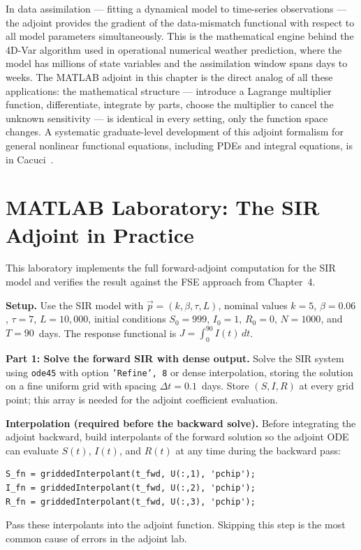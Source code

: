In data assimilation --- fitting a dynamical model to time-series
observations --- the adjoint provides the gradient of the
data-mismatch functional with respect to all model parameters
simultaneously.
This is the mathematical engine behind the 4D-Var algorithm used in
operational numerical weather prediction, where the model has
millions of state variables and the assimilation window spans days
to weeks.
The MATLAB adjoint in this chapter is the direct analog of all these
applications: the mathematical structure --- introduce a Lagrange
multiplier function, differentiate, integrate by parts, choose the
multiplier to cancel the unknown sensitivity --- is identical in
every setting, only the function space changes.
A systematic graduate-level development of this adjoint formalism
for general nonlinear functional equations, including PDEs and
integral equations, is in Cacuci~\cite{cacuci2003volume1}.

\section{MATLAB Laboratory: The SIR Adjoint in Practice}
\label{sec:ch6matlab}

This laboratory implements the full forward-adjoint computation
for the SIR model and verifies the result against the FSE approach
from Chapter~4.

\textbf{Setup.}
Use the SIR model with \POIs $\vec{p} = (k, \beta, \tau, L)$,
nominal values $k=5$, $\beta=0.06$, $\tau=7$, $L=10{,}000$,
initial conditions $S_0=999$, $I_0=1$, $R_0=0$, $N=1000$,
and $T = 90$~days.
The response functional is $J = \int_0^{90} I(t)\,dt$.

\textbf{Part 1: Solve the forward SIR with dense output.}
Solve the SIR system using \texttt{ode45} with option
\texttt{'Refine', 8} or dense interpolation, storing the solution
on a fine uniform grid with spacing $\Delta t = 0.1$~days.
Store $(S, I, R)$ at every grid point; this array is needed
for the adjoint coefficient evaluation.

\medskip\noindent
\textbf{Interpolation (required before the backward solve).}
Before integrating the adjoint backward, build interpolants of
the forward solution so the adjoint ODE can evaluate $S(t)$,
$I(t)$, and $R(t)$ at any time during the backward pass:
\begin{verbatim}
S_fn = griddedInterpolant(t_fwd, U(:,1), 'pchip');
I_fn = griddedInterpolant(t_fwd, U(:,2), 'pchip');
R_fn = griddedInterpolant(t_fwd, U(:,3), 'pchip');
\end{verbatim}
Pass these interpolants into the adjoint function. Skipping this
step is the most common cause of errors in the adjoint lab.

